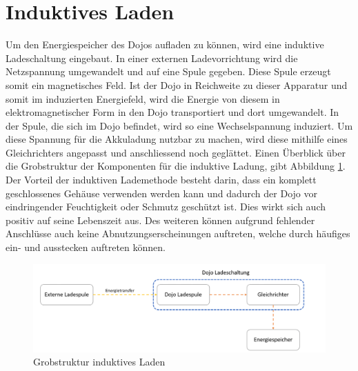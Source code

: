 \section{Induktives Laden}
Um den Energiespeicher des Dojos aufladen zu können, wird eine induktive Ladeschaltung eingebaut. In einer externen Ladevorrichtung wird die Netzspannung umgewandelt und auf eine Spule gegeben. Diese Spule erzeugt somit ein magnetisches Feld. Ist der Dojo in Reichweite zu dieser Apparatur und somit im induzierten Energiefeld, wird die Energie von diesem in elektromagnetischer Form in den Dojo transportiert und dort umgewandelt. In der Spule, die sich im Dojo befindet, wird so eine Wechselspannung induziert. Um diese Spannung für die Akkuladung nutzbar zu machen, wird diese mithilfe eines Gleichrichters angepasst und anschliessend noch geglättet. Einen Überblick über die Grobstruktur der Komponenten für die induktive Ladung, gibt Abbildung \ref{fig:Grobstruktur_ind_Laden}. Der Vorteil der induktiven Lademethode besteht darin, dass ein komplett geschlossenes Gehäuse verwenden werden kann und dadurch der Dojo vor eindringender Feuchtigkeit oder Schmutz geschützt ist. Dies wirkt sich auch positiv auf seine Lebenszeit aus. Des weiteren können aufgrund fehlender Anschlüsse auch keine Abnutzungserscheinungen auftreten, welche durch häufiges ein- und ausstecken auftreten können.

\begin{figure}[H]
\begin{center}
	\includegraphics[width=160mm]{data/Induktion.png}
	\caption{Grobstruktur induktives Laden} %
	\label{fig:Grobstruktur_ind_Laden}
\end{center}
\end{figure}